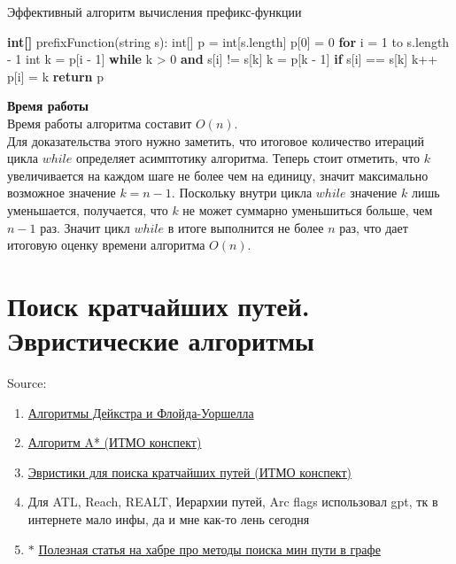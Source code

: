        \begin{algorithm}
        \caption{Эффективный алгоритм вычисления префикс-функции}
            \begin{algorithmic}
                \STATE \textbf{int[]} prefixFunction(string s):
                \STATE \quad int[] p = int[s.length]
                \STATE \quad p[0] = 0
                \STATE \quad \textbf{for} i = 1 to s.length - 1
                \STATE \quad\quad int k = p[i - 1]
                \STATE \quad\quad \textbf{while} k > 0 \textbf{and} s[i] != s[k]
                \STATE \quad\quad\quad k = p[k - 1]
                \STATE \quad\quad \textbf{if} s[i] == s[k]
                \STATE \quad\quad\quad k++
                \STATE \quad\quad p[i] = k
                \STATE \quad \textbf{return} p
            \end{algorithmic}
        \end{algorithm}

        \textbf{Время работы}\\
        Время работы алгоритма составит $O(n)$.\\

        Для доказательства этого нужно заметить, что итоговое количество итераций цикла $while$ определяет асимптотику алгоритма. Теперь стоит отметить, что $k$ увеличивается на каждом шаге не более чем на единицу, значит максимально возможное значение $k = n - 1$. Поскольку внутри цикла $while$ значение $k$ лишь уменьшается, получается, что $k$ не может суммарно уменьшиться больше, чем $n - 1$  раз. Значит цикл $while$ в итоге выполнится не более $n$ раз, что дает итоговую оценку времени алгоритма $O(n)$.
        
        

\newpage
\section{Поиск кратчайших путей. Эвристические алгоритмы}
    Source:
    \begin{enumerate}
        \item \href{https://se.moevm.info/doku.php/courses:algorithms_building_and_analysis:materials:shortest_ways}{Алгоритмы Дейкстра и Флойда-Уоршелла}
        \item \href{http://neerc.ifmo.ru/wiki/index.php?title=Алгоритм_A*}{Алгоритм A* (ИТМО конспект)}
        \item \href{https://neerc.ifmo.ru/wiki/index.php?title=Эвристики_для_поиска_кратчайших_путей}{Эвристики для поиска кратчайших путей (ИТМО конспект)}
        \item Для ATL, Reach, REALT, Иерархии путей, Arc flags использовал gpt, тк в интернете мало инфы, да и мне как-то лень сегодня
        \item $\ast$ \href{https://habr.com/ru/companies/2gis/articles/326638/}{Полезная статья на хабре про методы поиска мин пути в графе}
    \end{enumerate}
